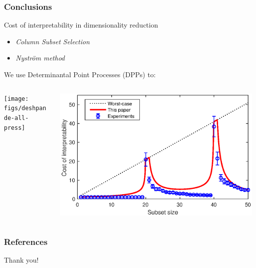 \documentclass{beamer}
\begin{document}
  \begin{frame}
  \frametitle{Conclusions}
Cost of interpretability in dimensionality reduction
  \begin{itemize}
  \item \textit{Column Subset Selection}
  \item   \textit{Nystr\"om method}
  \end{itemize}
  \vspace{8mm}
  
We use Determinantal Point Processes (DPPs) to:
  \vspace{5mm}

 \begin{columns}
   \hspace{-3mm}\begin{column}{.48\textwidth}
     \centering
{}

\texttt{[image: figs/deshpande-all-press]}
\end{column}
\begin{column}{.48\textwidth}

  \includegraphics[width=1.05\textwidth]{figs/nystrom-bounds-press}
\end{column}
\end{columns}

\end{frame}


\begin{frame}[allowframebreaks]
  \frametitle{References}
  \tiny
  
  
\end{frame}

\begin{frame}
\centering  \Large Thank you!
\end{frame}
\end{document}
